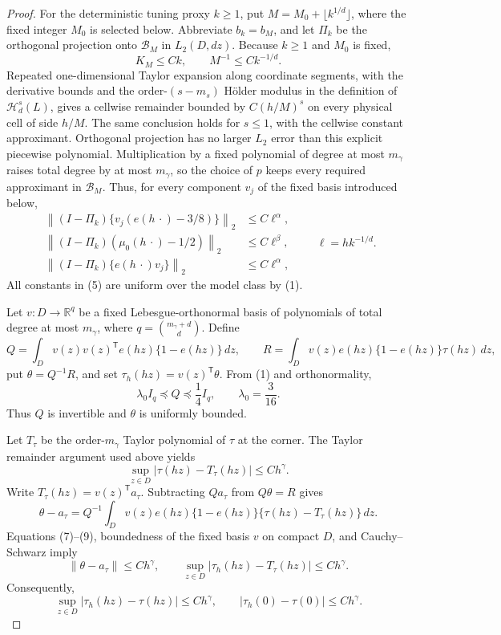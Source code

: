 \documentclass{article}
\begin{document}
\begin{proof}
For the deterministic tuning proxy \(k\geq1\), put \(M=M_0+\lfloor k^{1/d}\rfloor\), where the fixed integer \(M_0\) is selected below.  Abbreviate \(b_k=b_M\), and let \(\Pi_k\) be the orthogonal projection onto \(\mathcal B_M\) in \(L_2(D,dz)\).  Because \(k\geq1\) and \(M_0\) is fixed,
\[
 K_M\leq Ck,
 \qquad M^{-1}\leq Ck^{-1/d}.
 \tag{4}
\]
Repeated one-dimensional Taylor expansion along coordinate segments, with the derivative bounds and the order-\((s-m_s)\) H\"older modulus in the definition of \(\mathcal H_d^s(L)\), gives a cellwise remainder bounded by \(C(h/M)^s\) on every physical cell of side \(h/M\).  The same conclusion holds for \(s\leq1\), with the cellwise constant approximant.  Orthogonal projection has no larger \(L_2\) error than this explicit piecewise polynomial.  Multiplication by a fixed polynomial of degree at most \(m_\gamma\) raises total degree by at most \(m_\gamma\), so the choice of \(p\) keeps every required approximant in \(\mathcal B_M\).  Thus, for every component \(v_j\) of the fixed basis introduced below,
\[
 \begin{split}
 \left\|(I-\Pi_k)\{v_j(e(h\,\cdot)-3/8)\}\right\|_2&\leq C\ell^\alpha,\\
 \left\|(I-\Pi_k)(\mu_0(h\,\cdot)-1/2)\right\|_2&\leq C\ell^\beta,\\
 \left\|(I-\Pi_k)\{e(h\,\cdot)v_j\}\right\|_2&\leq C\ell^\alpha,
 \end{split}
 \qquad \ell=hk^{-1/d}.
 \tag{5}
\]
All constants in (5) are uniform over the model class by (1).

Let \(v:D\to\mathbb R^q\) be a fixed Lebesgue-orthonormal basis of polynomials of total degree at most \(m_\gamma\), where \(q=\binom{m_\gamma+d}{d}\).  Define
\[
 Q=\int_Dv(z)v(z)^{\mathsf T}e(hz)\{1-e(hz)\}\,dz,
 \qquad
 R=\int_Dv(z)e(hz)\{1-e(hz)\}\tau(hz)\,dz,
 \tag{6}
\]
put \(\theta=Q^{-1}R\), and set \(\tau_h(hz)=v(z)^{\mathsf T}\theta\).  From (1) and orthonormality,
\[
 \lambda_0 I_q\preceq Q\preceq\frac14I_q,
 \qquad \lambda_0=\frac3{16}.
 \tag{7}
\]
Thus \(Q\) is invertible and \(\theta\) is uniformly bounded.

Let \(T_\tau\) be the order-\(m_\gamma\) Taylor polynomial of \(\tau\) at the corner.  The Taylor remainder argument used above yields
\[
 \sup_{z\in D}|\tau(hz)-T_\tau(hz)|\leq Ch^\gamma.
 \tag{8}
\]
Write \(T_\tau(hz)=v(z)^{\mathsf T}a_\tau\).  Subtracting \(Qa_\tau\) from \(Q\theta=R\) gives
\[
 \theta-a_\tau
 =Q^{-1}\int_Dv(z)e(hz)\{1-e(hz)\}
 \{\tau(hz)-T_\tau(hz)\}\,dz.
 \tag{9}
\]
Equations (7)--(9), boundedness of the fixed basis \(v\) on compact \(D\), and Cauchy--Schwarz imply
\[
 \|\theta-a_\tau\|\leq Ch^\gamma,
 \qquad
 \sup_{z\in D}|\tau_h(hz)-T_\tau(hz)|\leq Ch^\gamma.
 \tag{10}
\]
Consequently,
\[
 \sup_{z\in D}|\tau_h(hz)-\tau(hz)|\leq Ch^\gamma,
 \qquad
 |\tau_h(0)-\tau(0)|\leq Ch^\gamma.
 \tag{11}
\]


\end{proof}
\end{document}
